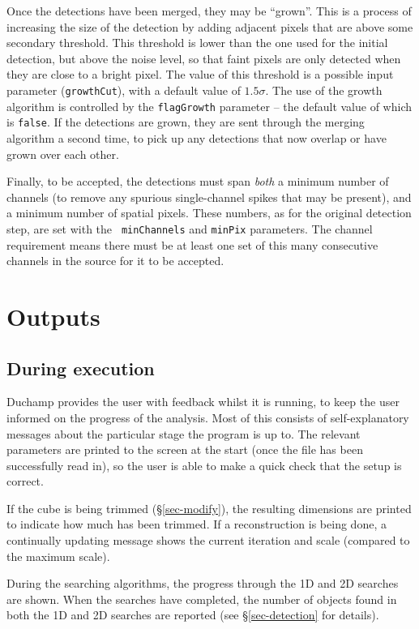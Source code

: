 \documentclass[12pt,a4paper]{article}
\begin{document}
Once the detections have been merged, they may be ``grown''. This is a
process of increasing the size of the detection by adding adjacent
pixels that are above some secondary threshold. This threshold is
lower than the one used for the initial detection, but above the noise
level, so that faint pixels are only detected when they are close to a
bright pixel. The value of this threshold is a possible input
parameter ({\tt growthCut}), with a default value of $1.5\sigma$. The
use of the growth algorithm is controlled by the {\tt flagGrowth}
parameter -- the default value of which is {\tt false}. If the
detections are grown, they are sent through the merging algorithm a
second time, to pick up any detections that now overlap or have grown
over each other.

Finally, to be accepted, the detections must span {\it both} a minimum
number of channels (to remove any spurious single-channel spikes that
may be present), and a minimum number of spatial pixels. These
numbers, as for the original detection step, are set with the {\tt
minChannels} and {\tt minPix} parameters. The channel requirement
means there must be at least one set of this many consecutive channels
in the source for it to be accepted.

\section{Outputs}
\label{sec-output}

\subsection{During execution}

Duchamp provides the user with feedback whilst it is running, to
keep the user informed on the progress of the analysis. Most of this
consists of self-explanatory messages about the particular stage the
program is up to. The relevant parameters are printed to the screen at
the start (once the file has been successfully read in), so the user
is able to make a quick check that the setup is correct.

If the cube is being trimmed (\S\ref{sec-modify}), the resulting
dimensions are printed to indicate how much has been trimmed. If a
reconstruction is being done, a continually updating message shows the
current iteration and scale (compared to the maximum scale). 

During the searching algorithms, the progress through the 1D and 2D
searches are shown. When the searches have completed,
the number of objects found in both the 1D and 2D searches are
reported (see \S\ref{sec-detection} for details).
\end{document}

